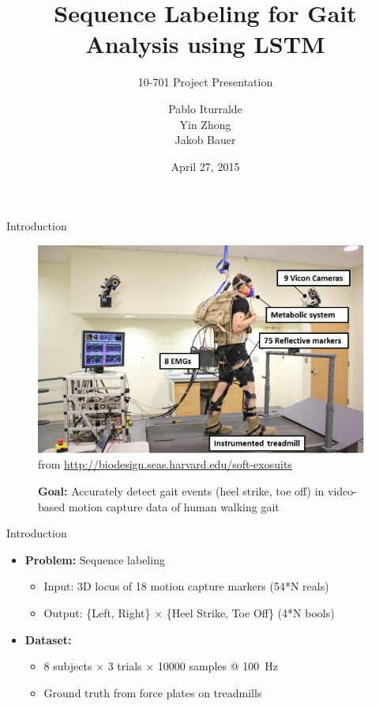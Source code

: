 \documentclass{beamer}
\title
{
    Sequence Labeling for Gait Analysis using LSTM
}
\subtitle
{
    10-701
    Project Presentation
}
\author
{
    Pablo Iturralde\\
    Yin Zhong\\
    Jakob Bauer
}
\date
{
    April 27, 2015
}
\begin{document}
\begin{frame}
  \titlepage
\end{frame}

\begin{frame}{Introduction}
    \begin{figure}[H]
        \begin{center}
        \includegraphics[height=.6\textheight]{figures/treadmill.png} \\
        \tiny from \url{http://biodesign.seas.harvard.edu/soft-exosuits}

        \small \textbf{Goal:}  Accurately detect gait events (heel strike, toe off) in video-based motion capture data of human walking gait
        \end{center}
    \end{figure}
\end{frame}

\begin{frame}{Introduction}
    \begin{itemize}
        \item \textbf{Problem:} Sequence labeling
        \begin{itemize}
            \item Input: 3D locus of 18 motion capture markers (54*N reals)
            \item Output: \{Left, Right\} $\times$ \{Heel Strike, Toe Off\} (4*N bools)
        \end{itemize}
        \item \textbf{Dataset:}
        \begin{itemize}
            \item 8 subjects $\times$ 3 trials $\times$ \num{10000} samples @ \SI{100}{\Hz}
            \item Ground truth from force plates on treadmills
        \end{itemize}
    \end{itemize}
\end{frame}
\end{document}
